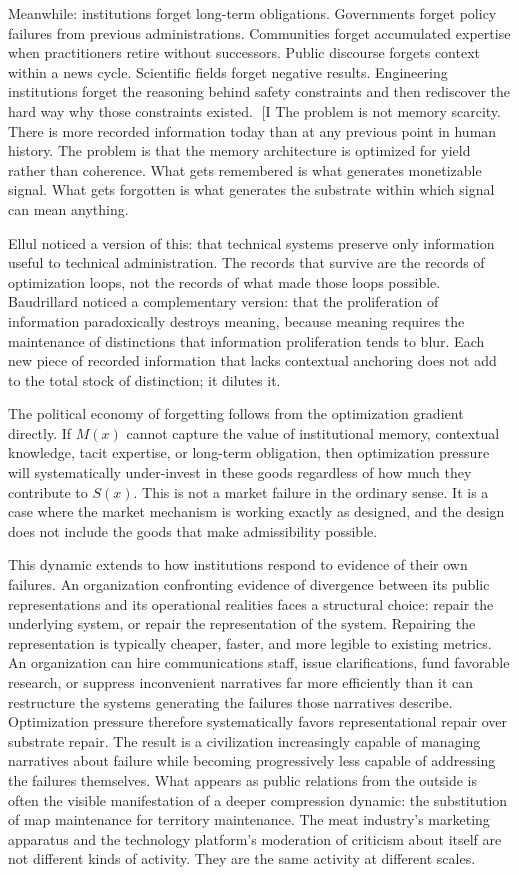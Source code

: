 \documentclass[11pt, letterpaper]{article}
\begin{document}
Meanwhile: institutions forget long-term obligations. Governments forget policy failures from previous administrations. Communities forget accumulated expertise when practitioners retire without successors. Public discourse forgets context within a news cycle. Scientific fields forget negative results. Engineering institutions forget the reasoning behind safety constraints and then rediscover the hard way why those constraints existed.
[I
The problem is not memory scarcity. There is more recorded information today than at any previous point in human history. The problem is that the memory architecture is optimized for yield rather than coherence. What gets remembered is what generates monetizable signal. What gets forgotten is what generates the substrate within which signal can mean anything.

Ellul noticed a version of this: that technical systems preserve only information useful to technical administration. The records that survive are the records of optimization loops, not the records of what made those loops possible. Baudrillard noticed a complementary version: that the proliferation of information paradoxically destroys meaning, because meaning requires the maintenance of distinctions that information proliferation tends to blur. Each new piece of recorded information that lacks contextual anchoring does not add to the total stock of distinction; it dilutes it.

The political economy of forgetting follows from the optimization gradient directly. If $M(x)$ cannot capture the value of institutional memory, contextual knowledge, tacit expertise, or long-term obligation, then optimization pressure will systematically under-invest in these goods regardless of how much they contribute to $S(x)$. This is not a market failure in the ordinary sense. It is a case where the market mechanism is working exactly as designed, and the design does not include the goods that make admissibility possible.

This dynamic extends to how institutions respond to evidence of their own failures. An organization confronting evidence of divergence between its public representations and its operational realities faces a structural choice: repair the underlying system, or repair the representation of the system. Repairing the representation is typically cheaper, faster, and more legible to existing metrics. An organization can hire communications staff, issue clarifications, fund favorable research, or suppress inconvenient narratives far more efficiently than it can restructure the systems generating the failures those narratives describe. Optimization pressure therefore systematically favors representational repair over substrate repair. The result is a civilization increasingly capable of managing narratives about failure while becoming progressively less capable of addressing the failures themselves. What appears as public relations from the outside is often the visible manifestation of a deeper compression dynamic: the substitution of map maintenance for territory maintenance. The meat industry's marketing apparatus and the technology platform's moderation of criticism about itself are not different kinds of activity. They are the same activity at different scales.
\end{document}
